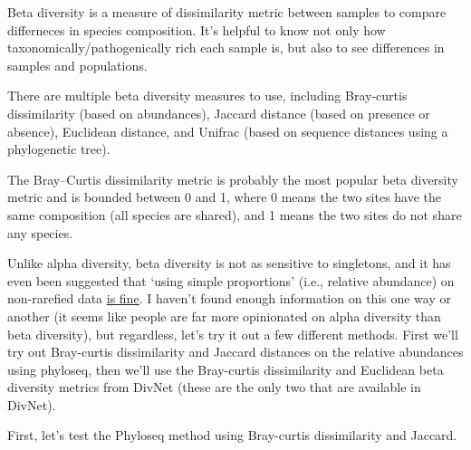\documentclass[]{article}
\begin{document}
Beta diversity is a measure of dissimilarity metric between samples to
compare differneces in species composition. It's helpful to know not
only how taxonomically/pathogenically rich each sample is, but also to
see differences in samples and populations.

There are multiple beta diversity measures to use, including Bray-curtis
dissimilarity (based on abundances), Jaccard distance (based on presence
or absence), Euclidean distance, and Unifrac (based on sequence
distances using a phylogenetic tree).

The Bray--Curtis dissimilarity metric is probably the most popular beta
diversity metric and is bounded between 0 and 1, where 0 means the two
sites have the same composition (all species are shared), and 1 means
the two sites do not share any species.

Unlike alpha diversity, beta diversity is not as sensitive to
singletons, and it has even been suggested that `using simple
proportions' (i.e., relative abundance) on non-rarefied data
\href{https://github.com/joey711/phyloseq/issues/470}{is fine}. I
haven't found enough information on this one way or another (it seems
like people are far more opinionated on alpha diversity than beta
diversity), but regardless, let's try it out a few different methods.
First we'll try out Bray-curtis dissimilarity and Jaccard distances on
the relative abundances using phyloseq, then we'll use the Bray-curtis
dissimilarity and Euclidean beta diversity metrics from DivNet (these
are the only two that are available in DivNet).

First, let's test the Phyloseq method using Bray-curtis dissimilarity
and Jaccard.
\end{document}
